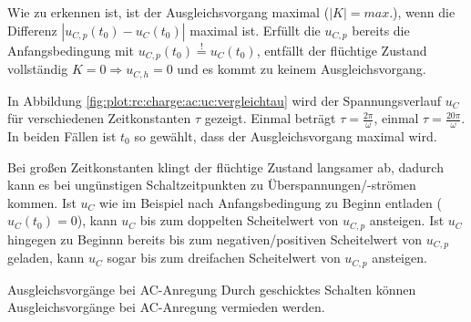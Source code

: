 \begin{frame}[t]
{    Wie zu erkennen ist, ist der Ausgleichsvorgang maximal ($|K|=max.$), wenn die Differenz $|u_{C,p}(t_0)- u_C(t_0)|$ maximal ist.
    Erfüllt die $u_{C,p}$ bereits die Anfangsbedingung mit $u_{C,p}(t_0)\overset{!}{=}u_C(t_0)$, entfällt der flüchtige Zustand vollständig $K=0 \Rightarrow u_{C,h}=0$ und es kommt zu keinem Ausgleichsvorgang.

    In Abbildung \ref{fig:plot:rc:charge:ac:uc:vergleichtau} wird der Spannungsverlauf $u_C$ für verschiedenen Zeitkonstanten $\tau$ gezeigt.
    Einmal beträgt $\tau=\frac{2\pi}{\omega}$, einmal $\tau=\frac{20\pi}{\omega}$.
    In beiden Fällen ist $t_0$ so gewählt, dass der Ausgleichsvorgang maximal wird.

    Bei großen Zeitkonstanten klingt der flüchtige Zustand langsamer ab, dadurch kann es bei ungünstigen Schaltzeitpunkten zu Überspannungen/-strömen kommen.
    Ist $u_C$ wie im Beispiel nach Anfangsbedingung zu Beginn entladen ($u_C(t_0)=0$), kann $u_C$ bis zum doppelten Scheitelwert von $u_{C,p}$ ansteigen.
    Ist $u_C$ hingegen zu Beginnn bereits bis zum negativen/positiven Scheitelwert von $u_{C,p}$ geladen, kann $u_C$ sogar bis zum dreifachen Scheitelwert von $u_{C,p}$ ansteigen.

    \begin{Merksatz}{Ausgleichsvorgänge bei AC-Anregung}
        Durch geschicktes Schalten können Ausgleichsvorgänge bei AC-Anregung vermieden werden.\vspace{5pt}


\end{Merksatz}}
\end{frame}
